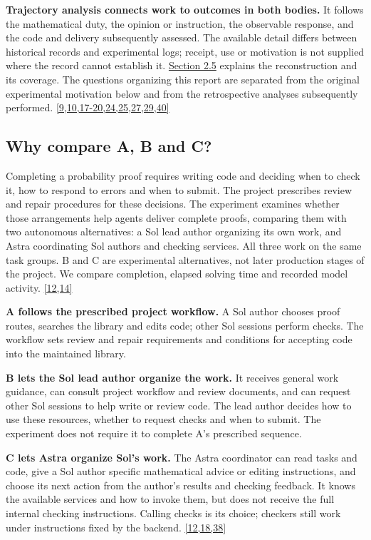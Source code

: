 \textbf{Trajectory analysis connects work to outcomes in both bodies.} It follows the mathematical duty, the opinion or instruction, the observable response, and the code and delivery subsequently assessed. The available detail differs between historical records and experimental logs; receipt, use or motivation is not supplied where the record cannot establish it. \hyperlink{section-2-5}{Section 2.5} explains the reconstruction and its coverage. The questions organizing this report are separated from the original experimental motivation below and from the retrospective analyses subsequently performed. \hyperlink{ref-9}{\mbox{[9,10,17-20,24,25,27,29,40]}}

\subsection[Why compare A, B and C?]{\texorpdfstring{\protect\hypertarget{section-2-1}{}Why compare A, B and C?}{Why compare A, B and C?}}
Completing a probability proof requires writing code and deciding when to check it, how to respond to errors and when to submit. The project prescribes review and repair procedures for these decisions. The experiment examines whether those arrangements help agents deliver complete proofs, comparing them with two autonomous alternatives: a Sol lead author organizing its own work, and Astra coordinating Sol authors and checking services. All three work on the same task groups. B and C are experimental alternatives, not later production stages of the project. We compare completion, elapsed solving time and recorded model activity. \hyperlink{ref-12}{\mbox{[12,14]}}

\textbf{A follows the prescribed project workflow.} A Sol author chooses proof routes, searches the library and edits code; other Sol sessions perform checks. The workflow sets review and repair requirements and conditions for accepting code into the maintained library.

\textbf{B lets the Sol lead author organize the work.} It receives general work guidance, can consult project workflow and review documents, and can request other Sol sessions to help write or review code. The lead author decides how to use these resources, whether to request checks and when to submit. The experiment does not require it to complete A's prescribed sequence.

\textbf{C lets Astra organize Sol's work.} The Astra coordinator can read tasks and code, give a Sol author specific mathematical advice or editing instructions, and choose its next action from the author's results and checking feedback. It knows the available services and how to invoke them, but does not receive the full internal checking instructions. Calling checks is its choice; checkers still work under instructions fixed by the backend. \hyperlink{ref-12}{\mbox{[12,18,38]}}

